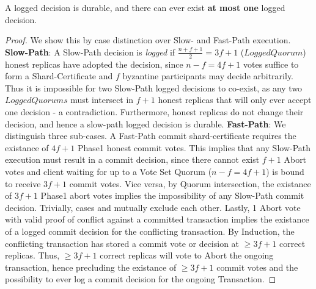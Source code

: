 \begin{theorem}[Saf]
A logged decision is durable, and there can ever exist \textbf{at most one} logged decision.
\end{theorem}
\begin{proof}

We show this by case distinction over Slow- and Fast-Path execution. \textbf{Slow-Path}: A Slow-Path decision is \textit{logged} if $\frac{n+f+1}{2} = 3f+1$ ($LoggedQuorum$) honest replicas have adopted the decision, since $n-f = 4f+1$ votes suffice to form a Shard-Certificate and $f$ byzantine participants may decide arbitrarily. Thus it is impossible for two Slow-Path logged decisions to co-exist, as any two $LoggedQuorums$ must intersect in $f+1$ honest replicas that will only ever accept one decision - a contradiction. Furthermore, honest replicas do not change their decision, and hence a slow-path logged decision is durable. \textbf{Fast-Path}: We distinguish three sub-cases. \one A Fast-Path commit shard-certificate requires the existance of $4f+1$ Phase1 honest commit votes. This implies that any Slow-Path execution must result in a commit decision, since there cannot exist $f+1$ Abort votes and client waiting for up to a Vote Set Quorum ($n-f = 4f+1$) is bound to receive $3f+1$ commit votes. \two Vice versa, by Quorum intersection, the existance of $3f+1$ Phase1 abort votes implies the impossibility of any Slow-Path commit decision. 
Trivially, cases \one and \two  mutually exclude each other. 
\three Lastly, 1 Abort vote with valid proof of conflict against a committed transaction implies the existance of a logged commit decision for the conflicting transaction. 
By Induction, the conflicting transaction has stored a commit vote or decision at $\geq 3f+1$ correct replicas. Thus, $\geq 3f+1$ correct replicas will vote to Abort the ongoing transaction, hence precluding the existance of $\geq 3f+1$ commit votes and the possibility to ever log a commit decision for the ongoing Transaction.


\end{proof} 

